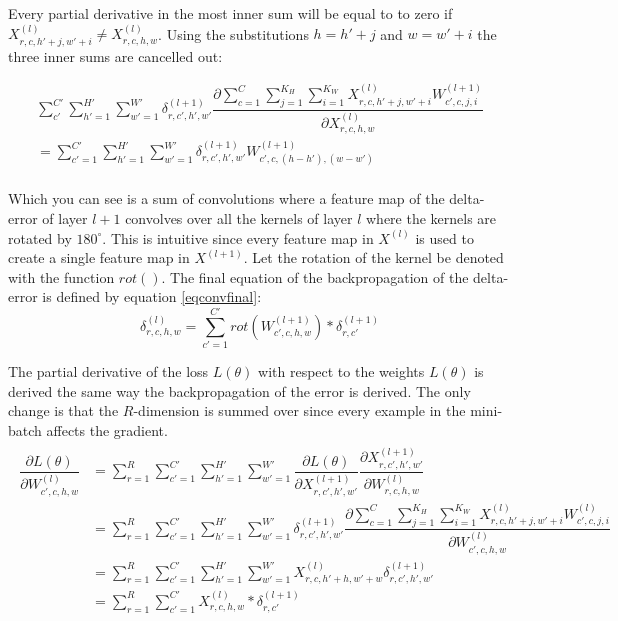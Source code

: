\documentclass[a4paper, twoside]{article}
\newcommand*{\pd}[2]{\ensuremath{\dfrac{\partial #1}{\partial #2}}}
\begin{document}
Every partial derivative in the most inner sum will be equal to to zero if $X^{(l)}_{r, c, h'+j, w'+i} \neq X^{(l)}_{r,c,h,w}$. Using the substitutions $h = h'+j$ and $w = w'+i$ the three inner sums are cancelled out: \cite{webconv1} \cite{webconv2} \cite{webconv3}

\begin{multline}
\sum^{C' }_{c'} \sum^{H' }_{h'=1} \sum^{W' }_{w'=1} \delta^{(l+1)}_{r,c',h',w'} \pd{\sum^{C }_{c=1} \sum^{K_H }_{j=1} \sum^{K_W }_{i=1} X^{(l)}_{r, c, h'+j, w'+i}W^{(l+1)}_{c', c, j, i}}{X^{(l)}_{r,c,h,w}} \\
	 = \sum^{C' }_{c'=1} \sum^{H' }_{h'=1} \sum^{W' }_{w'=1} \delta^{(l+1)}_{r,c',h',w'} W^{(l+1)}_{c', c, (h-h'), (w-w')}     \\
\end{multline}

Which you can see is a sum of convolutions where a feature map of the delta-error of layer $l+1$ convolves over all the kernels of layer $l$ where the kernels are rotated by $180^\circ$. This is intuitive since every feature map in $X^{(l)}$ is used to create a single feature map in $X^{(l+1)}$. Let the rotation of the kernel be denoted with the function $rot()$. The final equation of the backpropagation of the delta-error is defined by equation \eqref{eqconvfinal}: \cite{webconv1} \cite{webconv2} \cite{webconv3}
\begin{equation}\label{eqconvfinal}
\delta^{(l)}_{r,c,h,w} = \sum^{C' }_{c'=1} rot(W^{(l+1)}_{c',c,h,w}) * \delta^{(l+1)}_{r,c'}
\end{equation}

The partial derivative of the loss $L(\theta)$ with respect to the weights $L(\theta)$ is derived the same way the backpropagation of the error is derived. The only change is that the $R$-dimension is summed over since every example in the mini-batch affects the gradient. \cite{cs231n} \cite{webconv1} \cite{webconv2} \cite{webconv3} 
\begin{align}
\begin{split}
	\pd{L(\theta)}{W^{(l)}_{c',c,h,w}}
		& = \sum^{R }_{r=1} \sum^{C' }_{c'=1} \sum^{H' }_{h'=1} \sum^{W' }_{w'=1} \pd{L(\theta)}{X^{(l+1)}_{r,c',h',w'}} \pd{X^{(l+1)}_{r,c',h',w'}}{W^{(l)}_{r,c,h,w}} \\
		& = \sum^{R }_{r=1} \sum_{c'=1}^{C' } \sum^{H' }_{h'=1} \sum^{W' }_{w'=1} \delta^{(l+1)}_{r,c',h',w'} \pd{\sum\limits^{C }_{c=1} \sum\limits^{K_H }_{j=1} \sum\limits^{K_W }_{i=1} X^{(l)}_{r, c, h'+j, w'+i}W^{(l)}_{c', c, j, i}}{W^{(l)}_{c',c,h,w}} \\
		& = \sum^{R }_{r=1} \sum^{C' }_{c'=1} \sum^{H' }_{h'=1} \sum^{W' }_{w'=1} X^{(l)}_{r, c, h'+h, w'+w} \delta^{(l+1)}_{r,c',h',w'} \\
		& = \sum^{R }_{r=1} \sum^{C' }_{c'=1} X^{(l)}_{r, c, h, w} * \delta^{(l+1)}_{r,c'} \\
\end{split}
\end{align}
\end{document}

